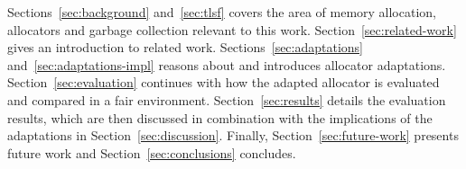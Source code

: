
Sections~\ref{sec:background} and~\ref{sec:tlsf} covers the area of memory allocation, allocators and garbage collection relevant to this work. Section~\ref{sec:related-work} gives an introduction to related work. Sections~\ref{sec:adaptations} and~\ref{sec:adaptations-impl} reasons about and introduces allocator adaptations. Section~\ref{sec:evaluation} continues with how the adapted allocator is evaluated and compared in a fair environment. Section~\ref{sec:results} details the evaluation results, which are then discussed in combination with the implications of the adaptations in Section~\ref{sec:discussion}. Finally, Section~\ref{sec:future-work} presents future work and Section~\ref{sec:conclusions} concludes.

